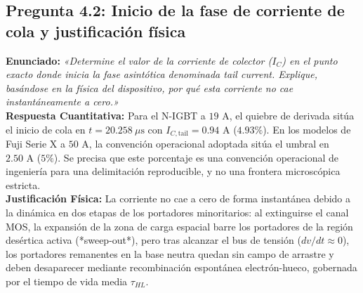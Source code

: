 \documentclass[11pt,a4paper]{article}
\begin{document}
\subsection{Pregunta 4.2: Inicio de la fase de corriente de cola y justificación física}
\textbf{Enunciado:} \textit{«Determine el valor de la corriente de colector ($I_C$) en el punto exacto donde inicia la fase asintótica denominada tail current. Explique, basándose en la física del dispositivo, por qué esta corriente no cae instantáneamente a cero.»}\\
\textbf{Respuesta Cuantitativa:} Para el N-IGBT a $19\text{ A}$, el quiebre de derivada sitúa el inicio de cola en $t = 20.258\ \mu\text{s}$ con $I_{C,\text{tail}} = 0.94\text{ A}$ ($4.93\%$). En los modelos de Fuji Serie X a $50\text{ A}$, la convención operacional adoptada sitúa el umbral en $2.50\text{ A}$ ($5\%$). Se precisa que este porcentaje es una convención operacional de ingeniería para una delimitación reproducible, y no una frontera microscópica estricta.\\
\textbf{Justificación Física:} La corriente no cae a cero de forma instantánea debido a la dinámica en dos etapas de los portadores minoritarios: al extinguirse el canal MOS, la expansión de la zona de carga espacial barre los portadores de la región desértica activa (*sweep-out*), pero tras alcanzar el bus de tensión ($dv/dt \approx 0$), los portadores remanentes en la base neutra quedan sin campo de arrastre y deben desaparecer mediante recombinación espontánea electrón-hueco, gobernada por el tiempo de vida media $\tau_{HL}$.
\end{document}
